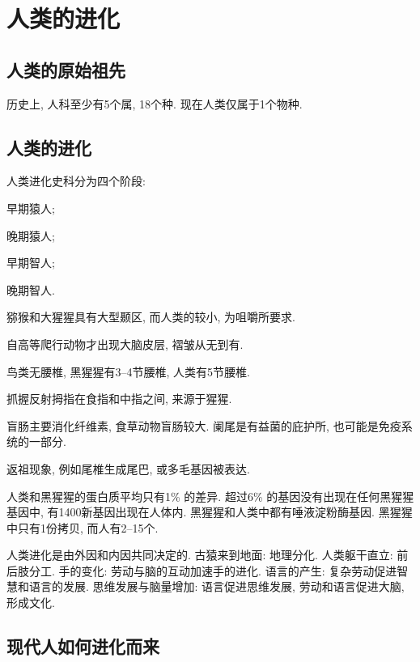 \documentclass{ctexart}
\begin{document}
\section{人类的进化} %
\label{sec:人类的进化}

\subsection{人类的原始祖先} %
\label{sub:人类的原始祖先}

历史上, 人科至少有5个属, 18个种. 现在人类仅属于1个物种.


\subsection{人类的进化} %
\label{sub:人类的进化}

人类进化史科分为四个阶段:
\begin{cenum}
    \item 早期猿人;
    \item 晚期猿人;
    \item 早期智人;
    \item 晚期智人.
\end{cenum}
猕猴和大猩猩具有大型颞区, 而人类的较小, 为咀嚼所要求.
\par
自高等爬行动物才出现大脑皮层, 褶皱从无到有.
\par
鸟类无腰椎, 黑猩猩有3--4节腰椎, 人类有5节腰椎.
\par
抓握反射拇指在食指和中指之间, 来源于猩猩.
\par
盲肠主要消化纤维素, 食草动物盲肠较大. 阑尾是有益菌的庇护所, 也可能是免疫系统的一部分.
\par
返祖现象, 例如尾椎生成尾巴, 或多毛基因被表达.
\par
人类和黑猩猩的蛋白质平均只有1\% 的差异. 超过6\% 的基因没有出现在任何黑猩猩基因中, 有1400新基因出现在人体内. 黑猩猩和人类中都有唾液淀粉酶基因. 黑猩猩中只有1份拷贝, 而人有2--15个.
\par
人类进化是由外因和内因共同决定的. 古猿来到地面: 地理分化. 人类躯干直立: 前后肢分工. 手的变化: 劳动与脑的互动加速手的进化. 语言的产生: 复杂劳动促进智慧和语言的发展. 思维发展与脑量增加: 语言促进思维发展, 劳动和语言促进大脑, 形成文化.


\subsection{现代人如何进化而来} %
\label{sub:现代人如何进化而来}
\end{document}
